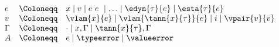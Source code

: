 {\flushleft
$\begin{array}{l c l}
  e & \Coloneqq & x \mid v \mid e~e~ \mid \ldots \mid \edyn{\tau}{e} \mid \esta{\tau}{e}
\\
  v & \Coloneqq & \vlam{x}{e} \mid \vlam{\tann{x}{\tau}}{e} \mid i \mid \vpair{v}{v}
\\
  \Gamma & \Coloneqq & \cdot \mid x,\Gamma \mid \tann{x}{\tau},\Gamma
\\
  A & \Coloneqq & e \mid \typeerror \mid \valueerror
\end{array}$

\medskip
\begin{minipage}{0.5\columnwidth}
\begin{mathpar}
\end{mathpar}
\end{minipage}%
\begin{minipage}{0.5\columnwidth}
\begin{mathpar}
\end{mathpar}
\end{minipage}


}
